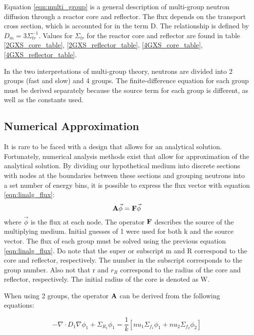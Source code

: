 \documentclass[../main.tex]{subfiles}
\begin{document}
	Equation \ref{eqn:multi_group} is a general description of multi-group neutron diffusion through a reactor core and reflector. The flux depends on the transport cross section, which is accounted for in the term D.  The relationship is defined by $D_m = 3 \Sigma_{tr}^{-1}$. Values for $\Sigma_{tr}$ for the reactor core and reflector are found in table \ref{2GXS_core_table}, \ref{2GXS_reflector_table}, \ref{4GXS_core_table}, \ref{4GXS_reflector_table}.
	
	In the two interpretations of multi-group theory, neutrons are divided into 2 groups (fast and slow) and 4 groups.  The finite-difference equation for each group must be derived separately because the source term for each group is different, as well as the constants used. 

	
\subsection{Numerical Approximation} \label{ssec:numerical}
	It is rare to be faced with a design that allows for an analytical solution. Fortunately, numerical analysis methods exist that allow for approximation of the analytical solution. By dividing our hypothetical medium into discrete sections with nodes at the boundaries between these sections and grouping neutrons into a set number of energy bins, it is possible to express the flux vector with equation \ref{eqn:linalg_flux}:
	\begin{equation}
		\mathbf{A} \vec{\phi} = \mathbf{F} \vec{\phi}
		\label{eqn:linalg_flux}
	\end{equation}
	where $\vec{\phi}$ is the flux at each node. The operator $\mathbf{F}$ describes the source of the multiplying medium.  Initial guesses of 1 were used for both k and the source vector.  The flux of each group must be solved using the previous equation  \ref{eqn:linalg_flux}.  Do note that the super or subscript m and R correspond to the core and reflector, respectively.  The number in the subscript corresponds to the group number.  Also not that r and $r_R$ correspond to the radius of the core and reflector, respectively.  The initial radius of the core is denoted as W. 
	
	When using 2 groups, the operator $\mathbf{A}$ can be derived from the following equations:
	
	\begin{equation*}
		- \nabla \cdot D_{1} \nabla \phi_{1}+ \Sigma_{R_1} \phi_1 = \frac{1}{k} [nu_1 \Sigma_{f_1} \phi_{1} + nu_2 \Sigma_{f_2} \phi_{2}] 
	\end{equation*}
	
\end{document}
